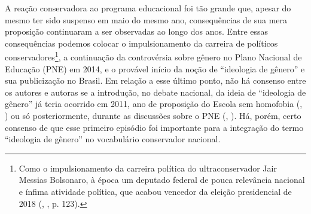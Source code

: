 \documentclass[
	12pt,				%
	openright,			%
	twoside,			%
	a4paper,			%
	english,			%
	brazil				%
	]{abntex2}
\begin{document}
 A reação conservadora ao programa educacional foi tão grande que, apesar do mesmo ter sido suspenso em maio do mesmo ano, consequências de sua mera proposição continuaram a ser observadas ao longo dos anos. Entre essas consequências podemos colocar o impulsionamento da carreira de políticos conservadores\footnote{Como o impulsionamento da carreira política do ultraconservador Jair Messias Bolsonaro, à época um deputado federal de pouca relevância nacional e ínfima atividade política, que acabou vencedor da eleição presidencial de 2018 (, \citeyear{leite2019}, p. 123).}, a continuação da controvérsia sobre gênero no Plano Nacional de Educação (PNE) em 2014, e o provável início da noção de “ideologia de gênero” e sua publicização no Brasil. Em relação a esse último ponto, não há consenso entre os autores e autoras se a introdução, no debate nacional, da ideia de “ideologia de gênero” já teria ocorrido em 2011, ano de proposição do Escola sem homofobia (, \citeyear{milkolcicampana2017}) ou só posteriormente, durante as discussões sobre o PNE (, \citeyear{leite2019}). Há, porém, certo consenso de que esse primeiro episódio foi importante para a integração do termo “ideologia de gênero” no vocabulário conservador nacional.
 
\end{document}
